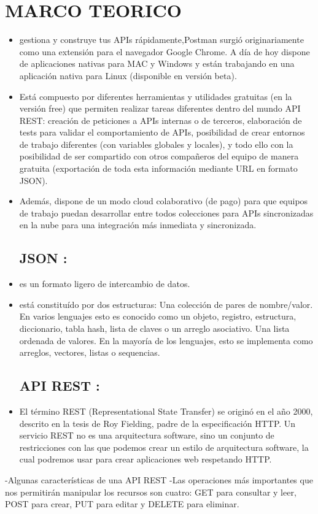 \section{MARCO TEORICO} 
\begin{itemize}
\subsection{Postman:}
	\item gestiona y construye tus APIs rápidamente,Postman surgió originariamente como una extensión para el navegador Google Chrome. A día de hoy dispone de aplicaciones nativas para MAC y Windows y están trabajando en una aplicación nativa para Linux (disponible en versión beta).
	\item Está compuesto por diferentes herramientas y utilidades gratuitas (en la versión free) que permiten realizar tareas diferentes dentro del mundo API REST: creación de peticiones a APIs internas o de terceros, elaboración de tests para validar el comportamiento de APIs, posibilidad de crear entornos de trabajo diferentes (con variables globales y locales), y todo ello con la posibilidad de ser compartido con otros compañeros del equipo de manera gratuita (exportación de toda esta información mediante URL en formato JSON).
	\item Además, dispone de un modo cloud colaborativo (de pago) para que equipos de trabajo puedan desarrollar entre todos colecciones para APIs sincronizadas en la nube para una integración más inmediata y sincronizada.

\subsection{JSON :}
	\item es un formato ligero de intercambio de datos. 
          \item  está constituído por dos estructuras:
Una colección de pares de nombre/valor. En varios lenguajes esto es conocido como un objeto, registro, estructura, diccionario, tabla hash, lista de claves o un arreglo asociativo.
Una lista ordenada de valores. En la mayoría de los lenguajes, esto se implementa como arreglos, vectores, listas o sequencias.
\subsection{API REST :}
          \item El término REST (Representational State Transfer) se originó en el año 2000, descrito en la tesis de Roy Fielding, padre de la especificación HTTP. Un servicio REST no es una arquitectura software, sino un conjunto de restricciones con las que podemos crear un estilo de arquitectura software, la cual podremos usar para crear aplicaciones web respetando HTTP. 

\end{itemize}
-Algunas características de una API REST
-Las operaciones más importantes que nos permitirán manipular los recursos son cuatro:
 GET para consultar y leer, POST para crear, PUT para editar y DELETE para eliminar.

